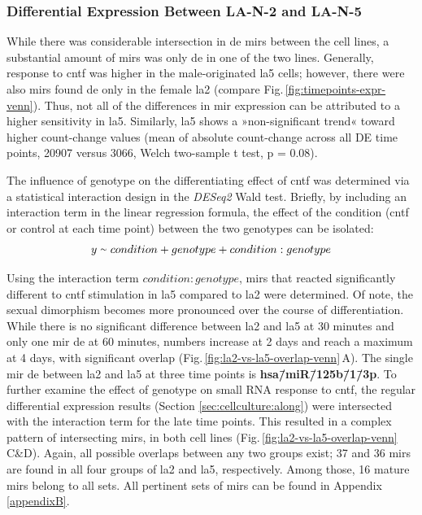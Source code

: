 \subsubsection{Differential Expression Between LA-N-2 and LA-N-5}
While there was considerable intersection in \ac{de} \acp{mir} between the cell lines, a substantial amount of \acp{mir} was only \ac{de} in one of the two lines. Generally, response to \ac{cntf} was higher in the male-originated \ac{la5} cells; however, there were also \acp{mir} found \ac{de} only in the female \ac{la2} (compare Fig.\,\ref{fig:timepoints-expr-venn}). Thus, not all of the differences in \ac{mir} expression can be attributed to a higher sensitivity in \ac{la5}. Similarly, \ac{la5} shows a »non-significant trend« toward higher count-change values (mean of absolute count-change across all DE time points, \num{20907} versus \num{3066}, Welch two-sample t test, p = 0.08).

The influence of genotype on the differentiating effect of \ac{cntf} was determined via a statistical interaction design in the \textit{DESeq2} Wald test. Briefly, by including an interaction term in the linear regression formula, the effect of the condition (\ac{cntf} or control at each time point) between the two genotypes can be isolated: $$y \smallsim condition + genotype + condition:genotype$$

Using the interaction term $condition:genotype$, \acp{mir} that reacted significantly different to \ac{cntf} stimulation in \ac{la5} compared to \ac{la2} were determined. Of note, the sexual dimorphism becomes more pronounced over the course of differentiation. While there is no significant difference between \ac{la2} and \ac{la5} at 30 minutes and only one \ac{mir} \ac{de} at 60 minutes, numbers increase at 2 days and reach a maximum at 4 days, with significant overlap (Fig.\,\ref{fig:la2-vs-la5-overlap-venn}\,A). The single \ac{mir} \ac{de} between \ac{la2} and \ac{la5} at three time points is \textbf{hsa\=/miR\=/125b\=/1\=/3p}.   To further examine the effect of genotype on small RNA response to \ac{cntf}, the regular differential expression results (Section \ref{sec:cellculture:along}) were intersected with the interaction term for the late time points. This resulted in a complex pattern of intersecting \acp{mir}, in both cell lines (Fig.\,\ref{fig:la2-vs-la5-overlap-venn}\,C\&D). Again, all possible overlaps between any two groups exist; 37 and 36 \acp{mir} are found in all four groups of \ac{la2} and \ac{la5}, respectively. Among those, 16 mature \acp{mir} belong to all sets. All pertinent sets of \acp{mir} can be found in Appendix \ref{appendixB}. 


